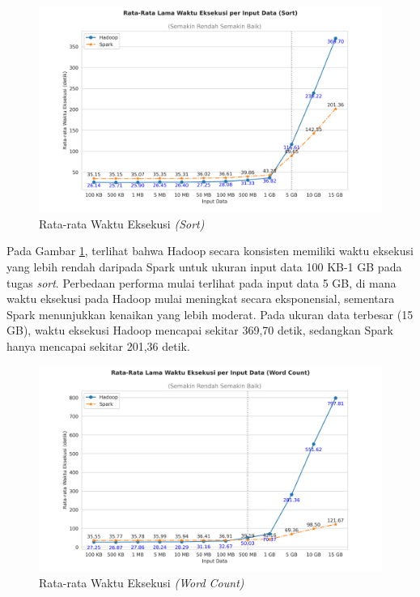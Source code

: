 \begin{figure}[h]
    \centering
    \includegraphics[width=1\textwidth]{figures/ch04/2-mean-lama-waktu-eksekusi-sort.png}
    \caption{Rata-rata Waktu Eksekusi \textit{(Sort)}}
    \label{fig:mean-dur-sort}
\end{figure}

Pada Gambar \ref{fig:mean-dur-sort}, terlihat bahwa Hadoop secara konsisten memiliki waktu eksekusi yang lebih rendah daripada Spark untuk ukuran input data 100 KB-1 GB pada tugas \textit{sort}. Perbedaan performa mulai terlihat pada input data 5 GB, di mana waktu eksekusi pada Hadoop mulai meningkat secara eksponensial, sementara Spark menunjukkan kenaikan yang lebih moderat. Pada ukuran data terbesar (15 GB), waktu eksekusi Hadoop mencapai sekitar 369,70 detik, sedangkan Spark hanya mencapai sekitar 201,36 detik.

\begin{figure}[h]
    \centering
    \includegraphics[width=1\textwidth]{figures/ch04/2-mean-lama-waktu-eksekusi-wordcount.png}
    \caption{Rata-rata Waktu Eksekusi \textit{(Word Count)}}
    \label{fig:mean-dur-wordcount}
\end{figure}

